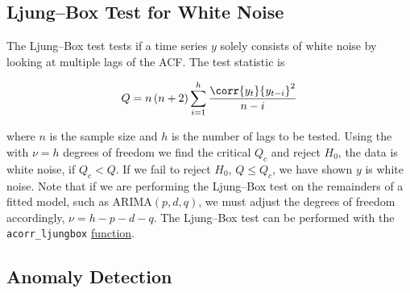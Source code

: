\subsection{Ljung--Box Test for White Noise}
\label{additional:time_series:ljung_box}

The Ljung--Box test tests if a time series $y$ solely consists of white noise
by looking at multiple lags of the ACF.
The test statistic is

\begin{equation}\label{eq:time_series:ljung_box:Q}
Q = n \left(n+2\right) \sum_{i=1}^{h} \frac{\corr{y_{t}}{y_{t-i}}^{2}}{n-i}
\end{equation}

\noindent where $n$ is the sample size and $h$ is the number of lags to be tested.
Using the \chiSqdist with $\nu = h$ degrees of freedom we find the critical $Q_{c}$
and reject $H_{0}$, the data is white noise, if $Q_{c} < Q$.
If we fail to reject $H_{0}$, \ie $Q \leq Q_{c}$, we have shown $y$ is white noise.
Note that if we are performing the Ljung--Box test on the remainders of a fitted model, such as $\text{ARIMA}\left(p,d,q\right)$,
we must adjust the degrees of freedom accordingly, $\nu = h - p - d - q$.
The Ljung--Box test can be performed with the \texttt{acorr\_ljungbox}
\href{https://www.statsmodels.org/stable/generated/statsmodels.stats.diagnostic.acorr_ljungbox.html}{function}.

\subsection{Anomaly Detection}
\label{additional:time_series:anomaly_detection}

